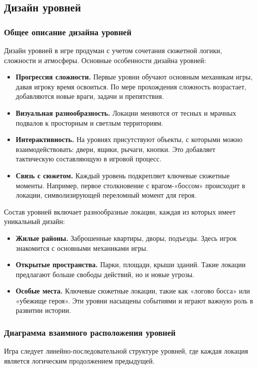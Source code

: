 \documentclass[12pt]{article}
\begin{document}
    \subsection{Дизайн уровней}
    
        \subsubsection{Общее описание дизайна уровней}
        Дизайн уровней в игре продуман с учетом сочетания сюжетной логики, сложности и атмосферы.
        Основные особенности дизайна уровней:  
        \begin{itemize}
            \item \textbf{Прогрессия сложности.} Первые уровни обучают основным механикам игры, давая игроку время освоиться. По мере прохождения сложность возрастает, добавляются новые враги, задачи и препятствия.  
            \item \textbf{Визуальная разнообразность.} Локации меняются от тесных и мрачных подвалов к просторным и светлым территориям.  
            \item \textbf{Интерактивность.} На уровнях присутствуют объекты, с которыми можно взаимодействовать: двери, ящики, рычаги, кнопки. Это добавляет тактическую составляющую в игровой процесс.  
            \item \textbf{Связь с сюжетом.} Каждый уровень подкрепляет ключевые сюжетные моменты. Например, первое столкновение с врагом-«боссом» происходит в локации, символизирующей переломный момент для героя.  
        \end{itemize}
        
        Состав уровней включает разнообразные локации, каждая из которых имеет уникальный дизайн:  
        \begin{itemize}
            \item \textbf{Жилые районы.} Заброшенные квартиры, дворы, подъезды. Здесь игрок знакомится с основными механиками игры.  
            \item \textbf{Открытые пространства.} Парки, площади, крыши зданий. Такие локации предлагают больше свободы действий, но и новые угрозы.  
            \item \textbf{Особые места.} Ключевые сюжетные локации, такие как «логово босса» или «убежище героя». Эти уровни насыщены событиями и играют важную роль в развитии истории.  
        \end{itemize}
        
        \subsubsection{Диаграмма взаимного расположения уровней}
        Игра следует линейно-последовательной структуре уровней, где каждая локация является логическим продолжением предыдущей.  
        
\end{document}
